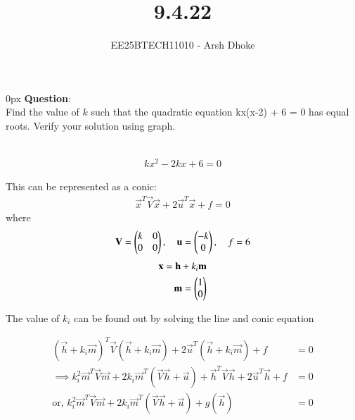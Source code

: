 \documentclass[journal]{IEEEtran}
\begin{document}

\vspace{3cm}

\title{9.4.22}
\author{EE25BTECH11010 - Arsh Dhoke}
{\let\newpage\relax\maketitle}

\renewcommand{\thefigure}{\theenumi}
\renewcommand{\thetable}{\theenumi}
\setlength{\intextsep}{10pt}
\renewcommand{\thetable}{\theenumi}

\parindent 0px
\textbf{Question}:\\
Find the value of $k$ such that the quadratic equation
kx(x-2) + 6 = 0 has equal roots. Verify your solution using graph.

\solution \\


\begin{align}
kx^2 - 2kx + 6 = 0
\end{align}

This can be represented as a conic:
\begin{align}
\vec{x}^{T}\vec{V}\vec{x} + 2\vec{u}^{T}\vec{x} + f = 0
\end{align}
where
\begin{align}
\mathbf{V} = \begin{pmatrix}k & 0 \\ 0 & 0\end{pmatrix}, \quad
\mathbf{u} = \begin{pmatrix}-k \\ 0\end{pmatrix}, \quad
f = 6
\end{align}
\begin{align}
\mathbf{x} = \mathbf{h} + k_i\mathbf{m} \\
\mathbf{m}=\begin{pmatrix}1 \\ 0\end{pmatrix}
\end{align}

The value of $k_i$ can be found out by solving the line and conic equation

\begin{align}
(\vec{h} + k_i \vec{m})^{T} \vec{V} (\vec{h} + k_i \vec{m}) + 2\vec{u}^{T} (\vec{h} + k_i \vec{m}) + f &= 0 \\
\implies k_i^{2} \vec{m}^{T}\vec{V}\vec{m} + 2k_i \vec{m}^{T} (\vec{V}\vec{h} + \vec{u}) + \vec{h}^{T}\vec{V}\vec{h} + 2\vec{u}^{T}\vec{h} + f &= 0 \\
\text{or, } k_i^{2} \vec{m}^{T}\vec{V}\vec{m} + 2k_i \vec{m}^{T} (\vec{V}\vec{h} + \vec{u}) + g(\vec{h}) &= 0
\end{align}
\end{document}
